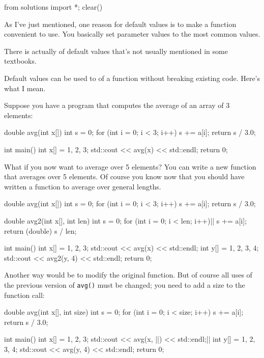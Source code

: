\begin{python0}
from solutions import *; clear()
\end{python0}

As I've just mentioned, one reason for default values is to make a function convenient to use. You basically set parameter values to the most common values.

There is actually  of default values that's not usually mentioned in some textbooks.

Default values can be used to  of a function without breaking existing code. Here's what I mean.

Suppose you have a program that computes the average of an array of 3 elements:

\begin{consolethree}[escapeinside=||]
double avg(int x[])
{
    int s = 0;
    for (int i = 0; i < 3; i++)
    {
        s += a[i];
    }
    return s / 3.0;
}

int main()
{
    int x[] = {1, 2, 3};
    std::cout << avg(x) << std::endl;
    return 0;
}
\end{consolethree}

What if you now want to average over 5 elements? You can write a new function that averages over 5 elements. Of course you know now that you should have written a function to average over general lengths.

\begin{consolethree}[escapeinside=||]
double avg(int x[])
{
    int s = 0;
    for (int i = 0; i < 3; i++)
    {
        s += a[i];
    }
    return s / 3.0;
}

double avg2(int x[], int len)
{
    int s = 0;
    for (int i = 0; i < len; i++)||
    {
        s += a[i];
    }
    return (double) s / len;
}

int main()
{
    int x[] = {1, 2, 3};
    std::cout << avg(x) << std::endl;
    int y[] = {1, 2, 3, 4};
    std::cout << avg2(y, 4) << std::endl;
    return 0;
}
\end{consolethree}

Another way would be to modify the original function. But of course all uses of the previous version of \texttt{avg()} must be changed; you need to add a size to the function call:

\begin{consolethree}[escapeinside=||]
double avg(int x[], int size)
{
    int s = 0;
    for (int i = 0; i < size; i++)
    {
        s += a[i];
    }
    return s / 3.0;
}

int main()
{
    int x[] = {1, 2, 3};
    std::cout << avg(x, ||) << std::endl;||
    int y[] = {1, 2, 3, 4};
    std::cout << avg(y, 4) << std::endl;
    return 0;
}
\end{consolethree}

